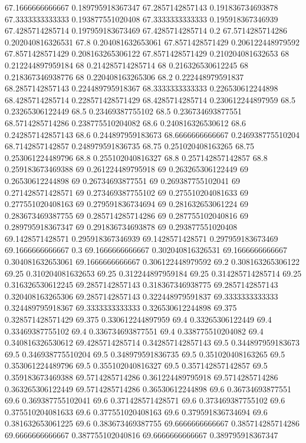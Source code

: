 {67.1666666666667 0.189795918367347
67.2857142857143 0.191836734693878
67.3333333333333 0.193877551020408
67.3333333333333 0.195918367346939
67.4285714285714 0.197959183673469
67.4285714285714 0.2
67.5714285714286 0.202040816326531
67.8 0.204081632653061
67.8571428571429 0.206122448979592
67.8571428571429 0.208163265306122
67.8571428571429 0.210204081632653
68 0.212244897959184
68 0.214285714285714
68 0.216326530612245
68 0.218367346938776
68 0.220408163265306
68.2 0.222448979591837
68.2857142857143 0.224489795918367
68.3333333333333 0.226530612244898
68.4285714285714 0.228571428571429
68.4285714285714 0.230612244897959
68.5 0.23265306122449
68.5 0.23469387755102
68.5 0.236734693877551
68.5714285714286 0.238775510204082
68.6 0.240816326530612
68.6 0.242857142857143
68.6 0.244897959183673
68.6666666666667 0.246938775510204
68.7142857142857 0.248979591836735
68.75 0.251020408163265
68.75 0.253061224489796
68.8 0.255102040816327
68.8 0.257142857142857
68.8 0.259183673469388
69 0.261224489795918
69 0.263265306122449
69 0.26530612244898
69 0.26734693877551
69 0.269387755102041
69 0.271428571428571
69 0.273469387755102
69 0.275510204081633
69 0.277551020408163
69 0.279591836734694
69 0.281632653061224
69 0.283673469387755
69 0.285714285714286
69 0.287755102040816
69 0.289795918367347
69 0.291836734693878
69 0.293877551020408
69.1428571428571 0.295918367346939
69.1428571428571 0.297959183673469
69.1666666666667 0.3
69.1666666666667 0.302040816326531
69.1666666666667 0.304081632653061
69.1666666666667 0.306122448979592
69.2 0.308163265306122
69.25 0.310204081632653
69.25 0.312244897959184
69.25 0.314285714285714
69.25 0.316326530612245
69.2857142857143 0.318367346938775
69.2857142857143 0.320408163265306
69.2857142857143 0.322448979591837
69.3333333333333 0.324489795918367
69.3333333333333 0.326530612244898
69.375 0.328571428571429
69.375 0.330612244897959
69.4 0.33265306122449
69.4 0.33469387755102
69.4 0.336734693877551
69.4 0.338775510204082
69.4 0.340816326530612
69.4285714285714 0.342857142857143
69.5 0.344897959183673
69.5 0.346938775510204
69.5 0.348979591836735
69.5 0.351020408163265
69.5 0.353061224489796
69.5 0.355102040816327
69.5 0.357142857142857
69.5 0.359183673469388
69.5714285714286 0.361224489795918
69.5714285714286 0.363265306122449
69.5714285714286 0.36530612244898
69.6 0.36734693877551
69.6 0.369387755102041
69.6 0.371428571428571
69.6 0.373469387755102
69.6 0.375510204081633
69.6 0.377551020408163
69.6 0.379591836734694
69.6 0.381632653061225
69.6 0.383673469387755
69.6666666666667 0.385714285714286
69.6666666666667 0.387755102040816
69.6666666666667 0.389795918367347
}
